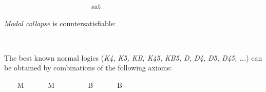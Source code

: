 \begin{isabellebody}
\begin{isamarkuptext}
\end{isamarkuptext}\isamarkuptrue%
\ \isamarkupfalse%
\ {\isachardoublequoteopen}{\isasymlfloor}\isactrlbold {\isasymdiamond}{\isasymphi}{\isasymrfloor}\ \ {\isasymlongrightarrow}\ {\isasymlfloor}\isactrlbold {\isasymbox}{\isasymphi}{\isasymrfloor}{\isachardoublequoteclose}\ \isamarkupfalse%
%
\isadelimproof
\ %
\endisadelimproof
%
\isatagproof
{}\isamarkupfalse%
\ \ \ \ \ \ \ \ \ \ \ \ %
%
\endisatagproof
{\isafoldproof}%
%
\isadelimproof
%
\endisadelimproof
\isanewline
\ \isamarkupfalse%
\ {\isachardoublequoteopen}{\isasymlfloor}\isactrlbold {\isasymbox}{\isasymphi}{\isasymrfloor}\isactrlsup s\isactrlsup a\isactrlsup t\ {\isasymlongrightarrow}\ {\isasymlfloor}\isactrlbold {\isasymbox}{\isasymphi}{\isasymrfloor}{\isachardoublequoteclose}\ \isamarkupfalse%
%
\isadelimproof
\ %
\endisadelimproof
%
\isatagproof
{}\isamarkupfalse%
\ \ \ \ \ \ \ \ \ \ \ %
%
\endisatagproof
{\isafoldproof}%
%
\isadelimproof
%
\endisadelimproof
%
\begin{isamarkuptext}%
\emph{Modal collapse} is countersatisfiable:%
\end{isamarkuptext}\isamarkuptrue%
\ \isamarkupfalse%
\ {\isachardoublequoteopen}{\isasymlfloor}{\isasymphi}\ \isactrlbold {\isasymrightarrow}\ \isactrlbold {\isasymbox}{\isasymphi}{\isasymrfloor}{\isachardoublequoteclose}\ \isamarkupfalse%
%
\isadelimproof
\ %
\endisadelimproof
%
\isatagproof
{}\isamarkupfalse%
\ \ \ \ \ \ \ \ \ \ \ \ \ \ \ \ \ \ %
%
\endisatagproof
{\isafoldproof}%
%
\isadelimproof
%
\endisadelimproof
%
\isamarkuptrue%
%
\begin{isamarkuptext}%
The best known normal logics (\emph{K4, K5, KB, K45, KB5, D, D4, D5, D45, ...}) can be obtained by
 combinations of the following axioms:%
\end{isamarkuptext}\isamarkuptrue%
\ \ \isamarkupfalse%
\ M\ \isanewline
\ \ \ \ \ {\isachardoublequoteopen}M\ {\isasymequiv}\ \isactrlbold {\isasymforall}{\isasymphi}{\isachardot}\ \isactrlbold {\isasymbox}{\isasymphi}\ \isactrlbold {\isasymrightarrow}\ {\isasymphi}{\isachardoublequoteclose}\isanewline
\ \ \isamarkupfalse%
\ B\ \isanewline
\ \ \ \ \ {\isachardoublequoteopen}B\ {\isasymequiv}\ \isactrlbold {\isasymforall}{\isasymphi}{\isachardot}\ {\isasymphi}\ \isactrlbold {\isasymrightarrow}\ \ \isactrlbold {\isasymbox}\isactrlbold {\isasymdiamond}{\isasymphi}{\isachardoublequoteclose}\isanewline

\end{isabellebody}

